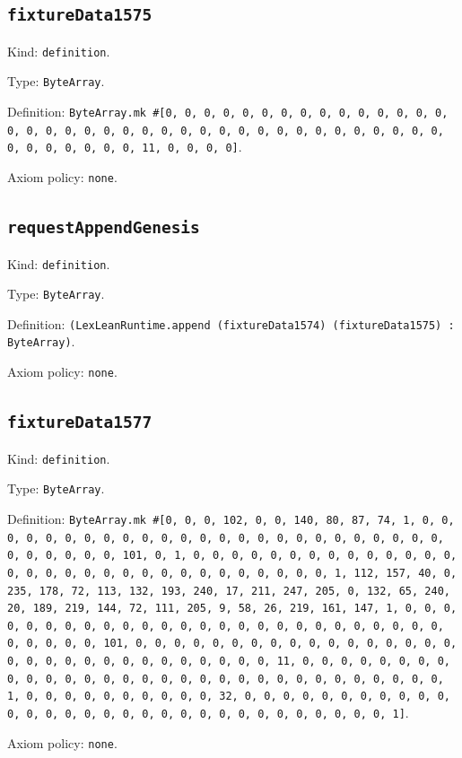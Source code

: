 \documentclass[11pt]{article}
\begin{document}
\subsection*{\texttt{fixtureData1575}}
\noindent Kind: \texttt{definition}.\par
\noindent Type: \texttt{ByteArray}.\par
\noindent Definition: \texttt{ByteArray.mk \#[0, 0, 0, 0, 0, 0, 0, 0, 0, 0, 0, 0, 0, 0, 0, 0, 0, 0, 0, 0, 0, 0, 0, 0, 0, 0, 0, 0, 0, 0, 0, 0, 0, 0, 0, 0, 0, 0, 0, 0, 0, 0, 0, 0, 0, 11, 0, 0, 0, 0]}.\par
\noindent Axiom policy: \texttt{none}.\par
\subsection*{\texttt{requestAppendGenesis}}
\noindent Kind: \texttt{definition}.\par
\noindent Type: \texttt{ByteArray}.\par
\noindent Definition: \texttt{(LexLeanRuntime.append (fixtureData1574) (fixtureData1575) : ByteArray)}.\par
\noindent Axiom policy: \texttt{none}.\par
\subsection*{\texttt{fixtureData1577}}
\noindent Kind: \texttt{definition}.\par
\noindent Type: \texttt{ByteArray}.\par
\noindent Definition: \texttt{ByteArray.mk \#[0, 0, 0, 102, 0, 0, 140, 80, 87, 74, 1, 0, 0, 0, 0, 0, 0, 0, 0, 0, 0, 0, 0, 0, 0, 0, 0, 0, 0, 0, 0, 0, 0, 0, 0, 0, 0, 0, 0, 0, 0, 0, 101, 0, 1, 0, 0, 0, 0, 0, 0, 0, 0, 0, 0, 0, 0, 0, 0, 0, 0, 0, 0, 0, 0, 0, 0, 0, 0, 0, 0, 0, 0, 0, 0, 0, 1, 112, 157, 40, 0, 235, 178, 72, 113, 132, 193, 240, 17, 211, 247, 205, 0, 132, 65, 240, 20, 189, 219, 144, 72, 111, 205, 9, 58, 26, 219, 161, 147, 1, 0, 0, 0, 0, 0, 0, 0, 0, 0, 0, 0, 0, 0, 0, 0, 0, 0, 0, 0, 0, 0, 0, 0, 0, 0, 0, 0, 0, 0, 0, 0, 101, 0, 0, 0, 0, 0, 0, 0, 0, 0, 0, 0, 0, 0, 0, 0, 0, 0, 0, 0, 0, 0, 0, 0, 0, 0, 0, 0, 0, 0, 0, 0, 11, 0, 0, 0, 0, 0, 0, 0, 0, 0, 0, 0, 0, 0, 0, 0, 0, 0, 0, 0, 0, 0, 0, 0, 0, 0, 0, 0, 0, 0, 0, 0, 1, 0, 0, 0, 0, 0, 0, 0, 0, 0, 0, 32, 0, 0, 0, 0, 0, 0, 0, 0, 0, 0, 0, 0, 0, 0, 0, 0, 0, 0, 0, 0, 0, 0, 0, 0, 0, 0, 0, 0, 0, 0, 0, 1]}.\par
\noindent Axiom policy: \texttt{none}.\par
\end{document}
